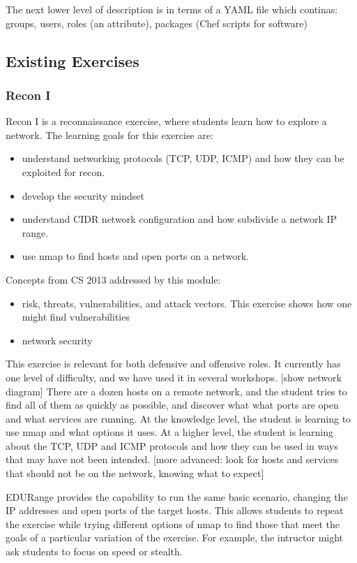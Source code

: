 The next lower level of description is in terms of a YAML file which continas:
 groups, users, roles (an attribute), packages (Chef scripts for software)


\subsection{Existing Exercises}
\subsubsection{Recon I}
Recon I  is a reconnaissance exercise, where students learn how to explore a network.
The learning goals for this exercise are:
\begin{itemize}
\item understand networking protocols (TCP, UDP, ICMP) and how they can be exploited for recon.
\item develop the security mindset
\item understand CIDR network configuration and how subdivide a network IP range.
\item use nmap to find hosts and open ports on a network.
\end{itemize}
Concepts from CS 2013 addressed by this module:
\begin{itemize}
\item  risk, threats, vulnerabilities, and attack vectors.  This exercise shows how one might 
  find vulnerabilities
\item network security
\end{itemize}


This exercise is relevant for both defensive and offensive roles.  It currently has one level of difficulty,
and we have used it in several workshops.
[show network diagram]
There are a dozen hosts on a remote network, and the student tries to find all of them as quickly as 
possible, and discover what what ports are open and what services are running.  At the knowledge level,
the student is learning to use nmap and what options it uses.  At a higher level, the student is learning
about the TCP, UDP and ICMP protocols and how they can be used in ways that may have not been intended.
[more advanced: look for hosts and services that should not be on the network, knowing what to expect]

EDURange provides the capability to run the same basic scenario, changing the IP addresses and open ports
of the target hosts.  This allows students to repeat the exercise while trying different options of nmap to
find those that meet the goals of a particular variation of the exercise.  For example, the intructor
might ask students to focus on speed or stealth.

